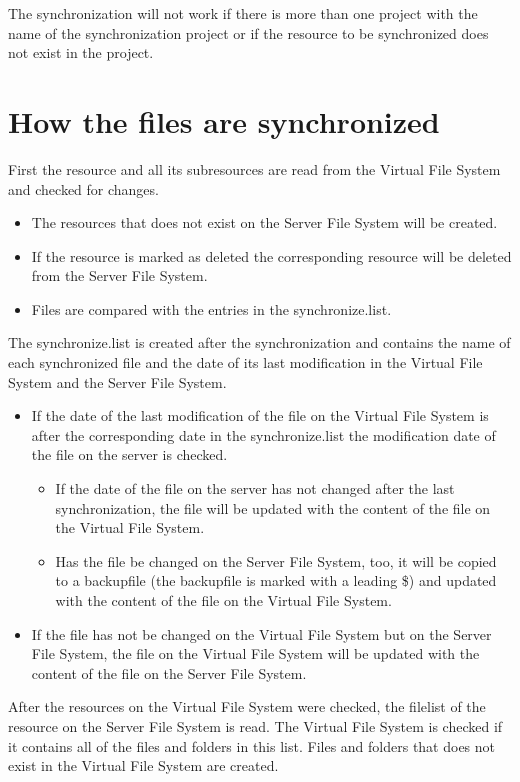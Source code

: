 The synchronization will not work if there is more than one project with the name of the synchronization project or if the resource to be synchronized does not exist in the project.

\section{How the files are synchronized}
First the resource and all its subresources are read from the Virtual File System and checked for changes.

\begin{itemize}
\item The resources that does not exist on the Server File System will be created.
\item If the resource is marked as deleted the corresponding resource will be deleted from the Server File System.
\item Files are compared with the entries in the {\dir synchronize.list}.
\end{itemize}

The {\dir synchronize.list} is created after the synchronization and contains the name of each synchronized file and the date of its last modification in the Virtual File System and the Server File System.

\begin{itemize}
\item If the date of the last modification of the file on the Virtual File System is after the corresponding date in the {\dir synchronize.list} the modification date of the file on the server is checked.
    \begin{itemize}
    \item If the date of the file on the server has not changed after the last synchronization, the file will be updated with the content of the file on the Virtual File System.
    \item Has the file be changed on the Server File System, too, it will be copied to a backupfile (the backupfile is marked with a leading {\name \$}) and updated with the content of the file on the Virtual File System.
    \end{itemize}
\item If the file has not be changed on the Virtual File System but on the Server File System, the file on the Virtual File System will be updated with the content of the file on the Server File System.
\end{itemize}

After the resources on the Virtual File System were checked, the filelist of the resource on the Server File System is read. The Virtual File System is checked if it contains all of the files and folders in this list. Files and folders that does not exist in the Virtual File System are created.

